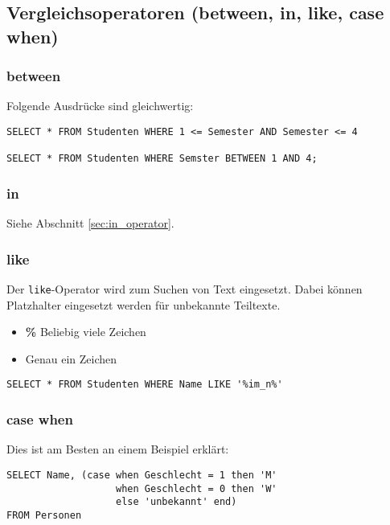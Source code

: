 \subsection{Vergleichsoperatoren (between, in, like, case when)}
\subsubsection{between}
Folgende Ausdrücke sind gleichwertig:

\begin{lstlisting}[caption={Beispiel between}]
SELECT * FROM Studenten WHERE 1 <= Semester AND Semester <= 4
        
SELECT * FROM Studenten WHERE Semster BETWEEN 1 AND 4;
\end{lstlisting}

\subsubsection{in}
Siehe Abschnitt \ref{sec:in_operator}.

\subsubsection{like}
Der \texttt{like}-Operator wird zum Suchen von Text eingesetzt. Dabei können Platzhalter eingesetzt werden für unbekannte Teiltexte.
\begin{itemize}
  \item \textbf{\%} Beliebig viele Zeichen
  \item \textbf{\underline {{ }{ }}} Genau ein Zeichen
\end{itemize}

\begin{lstlisting}[caption={Beispiel für like Operator}]
SELECT * FROM Studenten WHERE Name LIKE '%im_n%'
\end{lstlisting}

\subsubsection{case when}
Dies ist am Besten an einem Beispiel erklärt:

\begin{lstlisting}[caption={Beispiel für case when}]
SELECT Name, (case when Geschlecht = 1 then 'M'
                   when Geschlecht = 0 then 'W'
                   else 'unbekannt' end)
FROM Personen
\end{lstlisting}

